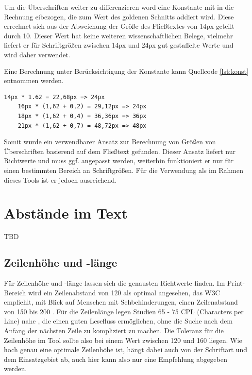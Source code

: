 Um die Überschriften weiter zu differenzieren word eine Konstante mit in die Rechnung eibezogen, die zum Wert des goldenen Schnitts addiert wird. Diese errechnet sich aus der Abweichung der Größe des Fließtextes von 14px geteilt durch 10.
Dieser Wert hat keine weiteren wissenschaftlichen Belege, vielmehr liefert er für Schriftgrößen zwischen 14px und 24px gut gestaffelte Werte und wird daher verwendet.

Eine Berechnung unter Berücksichtigung der Konstante kann Quellcode \ref{lst:konst} entnommen werden.

\begin{lstlisting}[caption={Berechnung mit einer Konstanten},label={lst:konst}]
	14px * 1.62 = 22,68px => 24px
	16px * (1,62 + 0,2) = 29,12px => 24px
	18px * (1,62 + 0,4) = 36,36px => 36px
	21px * (1,62 + 0,7) = 48,72px => 48px
\end{lstlisting}


Somit wurde ein verwendbarer Ansatz zur Berechnung von Größen von Überschriften basierend auf dem Fließtext gefunden. Dieser Ansatz liefert nur Richtwerte und muss ggf. angepasst werden, weiterhin funktioniert er nur für einen bestimmten Bereich an Schriftgrößen. Für die Verwendung als im Rahmen dieses Tools ist er jedoch ausreichend.



\section{Abstände im Text}
TBD

\subsection{Zeilenhöhe und -länge}
Für Zeilenhöhe und -länge lassen sich die genausten Richtwerte finden. Im Print-Bereich wird ein Zeilenabstand von 120 \cite[S. 150]{Runk200804} als optimal angesehen, das W3C empfiehlt, mit Blick auf Menschen mit Sehbehinderungen, einen Zeilenabstand von 150 bis 200 \cite{W3C}. Für die Zeilenlänge legen Studien 65 - 75 CPL (Characters per Line) nahe \cite{bernard2002effects}, die einen guten Lesefluss ermöglichen, ohne die Suche nach dem Anfang der nächsten Zeile zu kompliziert zu machen.
Die Toleranz für die Zeilenhöhe im Tool sollte also bei einem Wert zwischen 120 und 160 liegen. Wie hoch genau eine optimale Zeilenhöhe ist, hängt dabei auch von der Schriftart und dem Einsatzgebiet ab, auch hier kann also nur eine Empfehlung abgegeben werden.

